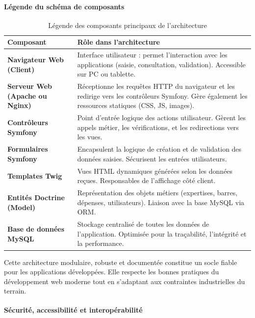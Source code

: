 \documentclass[11pt,a4paper]{article}
\begin{document}
\paragraph*{Légende du schéma de composants}

\begin{table}[H]
\centering
\begin{tabular}{|p{4.5cm}|p{10cm}|}
\hline
\textbf{Composant} & \textbf{Rôle dans l’architecture} \\
\hline
\textbf{Navigateur Web (Client)} & Interface utilisateur : permet l’interaction avec les applications (saisie, consultation, validation). Accessible sur PC ou tablette. \\
\hline
\textbf{Serveur Web (Apache ou Nginx)} & Réceptionne les requêtes HTTP du navigateur et les redirige vers les contrôleurs Symfony. Gère également les ressources statiques (CSS, JS, images). \\
\hline
\textbf{Contrôleurs Symfony} & Point d’entrée logique des actions utilisateur. Gèrent les appels métier, les vérifications, et les redirections vers les vues. \\
\hline
\textbf{Formulaires Symfony} & Encapsulent la logique de création et de validation des données saisies. Sécurisent les entrées utilisateurs. \\
\hline
\textbf{Templates Twig} & Vues HTML dynamiques générées selon les données reçues. Responsables de l’affichage côté client. \\
\hline
\textbf{Entités Doctrine (Model)} & Représentation des objets métiers (expertises, barres, dépenses, utilisateurs). Liaison avec la base MySQL via ORM. \\
\hline
\textbf{Base de données MySQL} & Stockage centralisé de toutes les données de l’application. Optimisée pour la traçabilité, l’intégrité et la performance. \\
\hline
\end{tabular}
\caption{Légende des composants principaux de l’architecture}
\label{tab:legende_composants}
\end{table}

Cette architecture modulaire, robuste et documentée constitue un socle fiable pour les applications développées. Elle respecte les bonnes pratiques du développement web moderne tout en s’adaptant aux contraintes industrielles du terrain.



\paragraph{Sécurité, accessibilité et interopérabilité}
\end{document}
